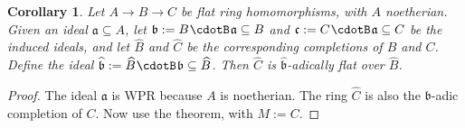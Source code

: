 \documentclass[10pt]{amsart}
\newtheorem{cor}[equation]{Corollary}
\theoremstyle{definition}
\numberwithin{equation}{section}
\newcommand{\sub}{\subseteq}
\newcommand{\cd}{\mspace{1.3mu}{\cdotB}\mspace{1.3mu}}
\newcommand{\mfrak}[1]{\mathfrak{#1}}
\renewcommand{\a}{\mfrak{a}}
\renewcommand{\b}{\mfrak{b}}
\renewcommand{\c}{\mfrak{c}}
\newcommand{\wh}[1]{\widehat{#1}}
\begin{document}
\begin{cor} \label{cor:510}
Let $A \to B \to C$ be flat ring homomorphisms, with $A$ noetherian.
Given an ideal $\a \sub A$, let $\b := B \cd \a \sub B$ and
$\c := C \cd \a \sub C$ be the induced ideals, and let
$\wh{B}$ and $\wh{C}$ be the corresponding completions of $B$ and $C$.
Define the ideal $\wh{\b} := \wh{B} \cd \b \sub \wh{B}$.
Then $\wh{C}$ is $\wh{\b}$-adically flat over $\wh{B}$.
\end{cor}

\begin{proof}
The ideal $\a$ is WPR because $A$ is noetherian.
The ring $\wh{C}$ is also the $\b$-adic completion of $C$.
Now use the theorem, with $M := C$.
\end{proof}
\end{document}
